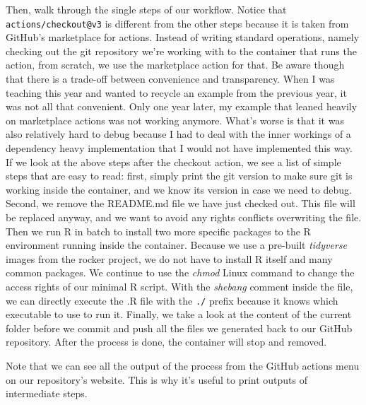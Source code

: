 \documentclass[
  12pt,
  letterpaper,
]{krantz}
\begin{document}
Then, walk through the single steps of our workflow. Notice that
\texttt{actions/checkout@v3} is different from the other steps because
it is taken from GitHub's marketplace for actions. Instead of writing
standard operations, namely checking out the git repository we're
working with to the container that runs the action, from scratch, we use
the marketplace action for that. Be aware though that there is a
trade-off between convenience and transparency. When I was teaching this
year and wanted to recycle an example from the previous year, it was not
all that convenient. Only one year later, my example that leaned heavily
on marketplace actions was not working anymore. What's worse is that it
was also relatively hard to debug because I had to deal with the inner
workings of a dependency heavy implementation that I would not have
implemented this way. If we look at the above steps after the checkout
action, we see a list of simple steps that are easy to read: first,
simply print the git version to make sure git is working inside the
container, and we know its version in case we need to debug. Second, we
remove the README.md file we have just checked out. This file will be
replaced anyway, and we want to avoid any rights conflicts overwriting
the file. Then we run R in batch to install two more specific packages
to the R environment running inside the container. Because we use a
pre-built \emph{tidyverse} images from the rocker project, we do not
have to install R itself and many common packages. We continue to use
the \emph{chmod} Linux command to change the access rights of our
minimal R script. With the \emph{shebang} comment inside the file, we
can directly execute the .R file with the \texttt{./} prefix because it
knows which executable to use to run it. Finally, we take a look at the
content of the current folder before we commit and push all the files we
generated back to our GitHub repository. After the process is done, the
container will stop and removed.

\begin{tcolorbox}[enhanced jigsaw, left=2mm, arc=.35mm, colbacktitle=quarto-callout-note-color!10!white, breakable, colframe=quarto-callout-note-color-frame, bottomrule=.15mm, bottomtitle=1mm, colback=white, leftrule=.75mm, coltitle=black, toptitle=1mm, titlerule=0mm, title=\textcolor{quarto-callout-note-color}{\faInfo}\hspace{0.5em}{Note}, opacityback=0, rightrule=.15mm, toprule=.15mm, opacitybacktitle=0.6]

Note that we can see all the output of the process from the
GitHub actions menu on our repository's website. This is
why it's useful to print outputs of intermediate steps.

\end{tcolorbox}
\end{document}
